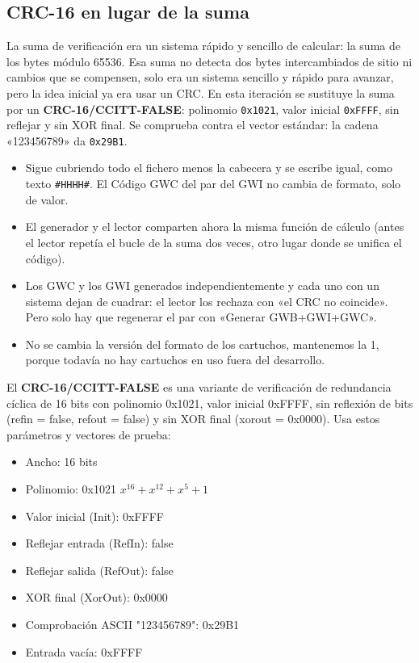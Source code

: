 \subsection{CRC-16 en lugar de la suma}
\label{sec:F5I14CRC}

La suma de verificación era un sistema rápido y sencillo de calcular: la suma de los bytes módulo 65536. Esa suma no detecta dos bytes intercambiados de sitio ni cambios que se compensen, solo era un sistema sencillo y rápido para avanzar, pero la idea inicial ya era usar un CRC. En esta iteración se sustituye la suma por un \textbf{CRC-16/CCITT-FALSE}: polinomio \texttt{0x1021}, valor inicial \texttt{0xFFFF}, sin reflejar y sin XOR final. Se comprueba contra el vector estándar: la cadena «123456789» da \texttt{0x29B1}.

\begin{itemize}
	\item Sigue cubriendo todo el fichero menos la cabecera y se escribe igual, como texto \texttt{\#HHHH\#}. El Código GWC del par del GWI no cambia de formato, solo de valor.

	\item El generador y el lector comparten ahora la misma función de cálculo (antes el lector repetía el bucle de la suma dos veces, otro lugar donde se unifica el código).

	\item Los GWC y los GWI generados independientemente y cada uno con un sistema dejan de cuadrar: el lector los rechaza con «el CRC no coincide». Pero solo hay que regenerar el par con «Generar GWB+GWI+GWC». 
	
	\item No se cambia la versión del formato de los cartuchos, mantenemos la 1, porque todavía no hay cartuchos en uso fuera del desarrollo.
\end{itemize}

El \textbf{CRC-16/CCITT-FALSE} es una variante de verificación de redundancia cíclica de 16 bits con polinomio 0x1021, valor inicial 0xFFFF, sin reflexión de bits (refin = false, refout = false) y sin XOR final (xorout = 0x0000). Usa estos parámetros y vectores de prueba:

\begin{itemize}
	\item Ancho: 16 bits
	\item Polinomio: 0x1021 $x^{16} + x^{12} + x^5 + 1$
	\item Valor inicial (Init): 0xFFFF
	\item Reflejar entrada (RefIn): false
	\item Reflejar salida (RefOut): false
	\item XOR final (XorOut): 0x0000
	\item Comprobación ASCII "123456789": 0x29B1
	\item Entrada vacía: 0xFFFF
\end{itemize}

